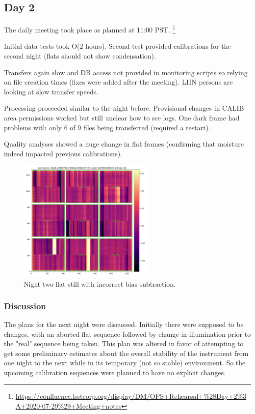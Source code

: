\subsection{Day 2} \label{sec:day2}

The daily meeting took place as planned at 11:00 PST. \footnote{\url{https://confluence.lsstcorp.org/display/DM/OPS+Rehearsal+\%28Day+2\%3A+2020-07-29\%29+Meeting+notes}}

Initial data tests took O(2 hours).  Second test provided calibrations for the
second night (flats should not show condensation).

Transfers again slow and DB access not provided in monitoring scripts so
relying on file creation times (fixes were added after the meeting).  LHN
persons are looking at slow transfer speeds.

Processing proceeded similar to the night before.  Provisional changes in
CALIB area permissions worked but still unclear how to see logs.  One dark frame
had problems with only 6 of 9 files being transferred (required a restart).

Quality analyses showed a huge change in flat frames (confirming that
moisture indeed impacted previous calibrations).


\begin{figure}
\includegraphics[width=0.6\textwidth]{figures/n2bad}
\caption{Night two flat still with incorrect bias subtraction.\label{fig:d2}}
\end{figure}

\subsubsection{Discussion}

The plans for the next night were discussed.  Initially there were supposed to be
changes, with an aborted flat sequence followed by change in illumination prior to
the "real" sequence being taken.  This plan was altered in favor of attempting to
get some preliminary estimates about the overall stability of the instrument from
one night to the next while in its temporary (not so stable) environment.  So the
upcoming calibration sequences were planned to have no explicit changes.


